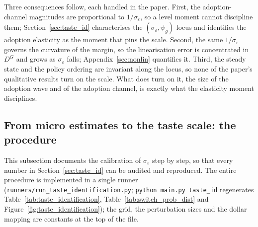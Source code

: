 

Three consequences follow, each handled in the paper. First, the adoption-channel
magnitudes are proportional to $1/\sigma_\varepsilon$, so a level moment cannot
discipline them; Section~\ref{sec:taste_id} characterises the
$(\sigma_\varepsilon,\psi_g)$ locus and identifies the adoption elasticity as the
moment that pins the scale. Second, the same $1/\sigma_\varepsilon$ governs the
curvature of the margin, so the linearisation error is concentrated in $D^{G}$
and grows as $\sigma_\varepsilon$ falls; Appendix~\ref{sec:nonlin} quantifies it.
Third, the steady state and the policy ordering are invariant along the locus, so
none of the paper's qualitative results turn on the scale. What does turn on
it, the size of the adoption wave and of the adoption channel, is exactly what
the elasticity moment disciplines.

\subsection{From micro estimates to the taste scale: the procedure}
\label{app:taste_procedure}

This subsection documents the calibration of $\sigma_\varepsilon$ step by step,
so that every number in Section~\ref{sec:taste_id} can be audited and
reproduced. The entire procedure is implemented in a single runner
(\texttt{runners/run\_taste\_identification.py}; \texttt{python main.py
taste\_id} regenerates Table~\ref{tab:taste_identification},
Table~\ref{tab:switch_prob_dist} and Figure~\ref{fig:taste_identification});
the grid, the perturbation sizes and the dollar mapping are constants at the top
of the file.


